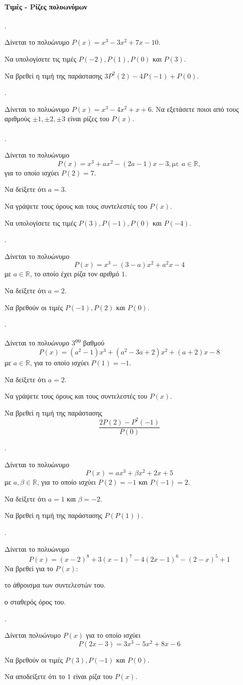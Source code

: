 \documentclass[11pt,a4paper,twocolumn]{article}
\newcounter{askhsh}
\newcommand{\askhsh}{{\large\theaskhsh.}\ \addtocounter{askhsh}{1}}
\newcommand{\tss}[1]{\textsuperscript{#1}}
\begin{document}
\paragraph{Τιμές - Ρίζες πολυωνύμων}
\askhsh Δίνεται το πολυώνυμο $P(x)=x^3-3x^2+7x-10$.
\begin{alist}
\item Να υπολογίσετε τις τιμές $P(-2),P(1),P(0)$ και $P(3)$.
\item Να βρεθεί η τιμή της παράστασης $3P^2(2)-4P(-1)+P(0)$.
\end{alist}
\askhsh Δίνεται το πολυώνυμο $P(x)=x^3-4x^2+x+6$. Να εξετάσετε ποιοι από τους αριθμούς $\pm1,\pm2,\pm3$ είναι ρίζες του $P(x)$.\\\\
\askhsh Δίνεται το πολυώνυμο \[P(x)=x^3+ax^2-(2a-1)x-3, \text{με }a\in\mathbb{R},\] για το οποίο ισχύει $P(2)=7$.
\begin{alist}
\item Να δείξετε ότι $a=3$.
\item Να γράψετε τους όρους και τους συντελεστές του $P(x)$.
\item Να υπολογίσετε τις τιμές $P(3),P(-1),P(0)$ και $P(-4)$.
\end{alist}
\askhsh Δίνεται το πολυώνυμο 
\[ P(x)=x^3-(3-a)x^2+a^2x-4 \]
με $a\in\mathbb{R}$, το οποίο έχει ρίζα τον αριθμό $1$.
\begin{alist}
\item Να δείξετε ότι $a=2$.
\item Να βρεθούν οι τιμές $P(-1),P(2)$ και $P(0)$.
\end{alist}
\askhsh Δίνεται το πολυώνυμο 3\tss{ου} βαθμού
\[ P(x)=(a^2-1)x^3+\left(a^2-3a+2\right)x^2+(a+2)x-8 \]
με $a\in\mathbb{R}$, για το οποίο ισχύει $P(1)=-1$.
\begin{alist}
\item  Να δείξετε ότι $a=2$.
\item  Να γράψετε τους όρους και τους συντελεστές του $P(x)$.
\item Να βρεθεί η τιμή της παράστασης \[\dfrac{2P(2)-P^2(-1)}{P(0)}\]
\end{alist}
\askhsh Δίνεται το πολυώνυμο \[P(x)=ax^3+\beta x^2+2x+5\]
με $a,\beta\in\mathbb{R}$, για το οποίο ισχύει $P(2)=-1$ και $P(-1)=2$.
\begin{alist}
\item Να δείξετε ότι $a=1$ και $\beta=-2$.
\item Να βρεθεί η τιμή της παράστασης $ P(P(1)) $.
\end{alist}
\askhsh Δίνεται το πολυώνυμο
\[ P(x)=(x-2)^{8}+3(x-1)^7-4(2x-1)^6-(2-x)^5+1 \]
Να βρεθεί για το $P(x)$:
\begin{alist}
\item το άθροισμα των συντελεστών του.
\item ο σταθερός όρος του.
\end{alist}
\askhsh Δίνεται πολυώνυμο $P(x)$ για το οποίο ισχύει
\[ P(2x-3)=3x^3-5x^2+8x-6 \]
\begin{alist}
\item Να βρεθούν οι τιμές $P(3),P(-1)$ και $P(0)$.
\item Να αποδείξετε ότι το $ 1 $ είναι ρίζα του $P(x)$.
\end{alist}
\end{document}

